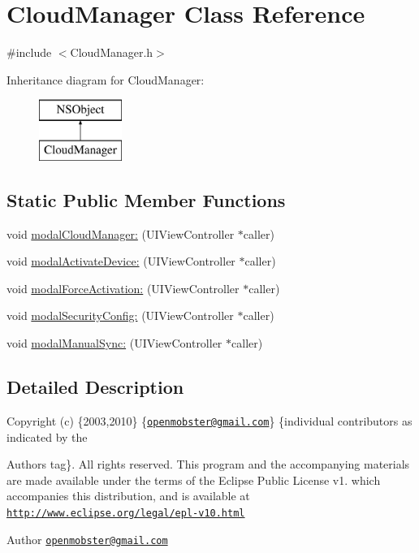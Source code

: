 \hypertarget{interface_cloud_manager}{
\section{\-Cloud\-Manager \-Class \-Reference}
\label{interface_cloud_manager}
}


{\ttfamily \#include $<$\-Cloud\-Manager.\-h$>$}

\-Inheritance diagram for \-Cloud\-Manager\-:\begin{figure}[H]
\begin{center}
\leavevmode
\includegraphics[height=2.000000cm]{interface_cloud_manager}
\end{center}
\end{figure}
\subsection*{\-Static \-Public \-Member \-Functions}
\begin{DoxyCompactItemize}
\item 
void \hyperlink{interface_cloud_manager_a6ae267e8d2feb7cf7319b0b780cd85c8}{modal\-Cloud\-Manager\-:} (\-U\-I\-View\-Controller $\ast$caller)
\item 
void \hyperlink{interface_cloud_manager_aa8ae774ab9ecc8f7fd3fdf21449f37b6}{modal\-Activate\-Device\-:} (\-U\-I\-View\-Controller $\ast$caller)
\item 
void \hyperlink{interface_cloud_manager_ac5541c0c77016bb5f3d6b9667d4e1045}{modal\-Force\-Activation\-:} (\-U\-I\-View\-Controller $\ast$caller)
\item 
void \hyperlink{interface_cloud_manager_ae4bf44780cd8facd28c00a7bbeec2bf1}{modal\-Security\-Config\-:} (\-U\-I\-View\-Controller $\ast$caller)
\item 
void \hyperlink{interface_cloud_manager_a87109519e8ddadef9d1f711704f34fc6}{modal\-Manual\-Sync\-:} (\-U\-I\-View\-Controller $\ast$caller)
\end{DoxyCompactItemize}


\subsection{\-Detailed \-Description}
\-Copyright (c) \{2003,2010\} \{\href{mailto:openmobster@gmail.com}{\tt openmobster@gmail.\-com}\} \{individual contributors as indicated by the \begin{DoxyAuthor}{\-Authors}
tag\}. \-All rights reserved. \-This program and the accompanying materials are made available under the terms of the \-Eclipse \-Public \-License v1. which accompanies this distribution, and is available at \href{http://www.eclipse.org/legal/epl-v10.html}{\tt http\-://www.\-eclipse.\-org/legal/epl-\/v10.\-html}
\end{DoxyAuthor}
\begin{DoxyAuthor}{\-Author}
\href{mailto:openmobster@gmail.com}{\tt openmobster@gmail.\-com} 
\end{DoxyAuthor}


